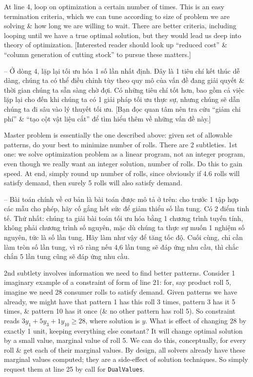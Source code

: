 \documentclass{article}
\begin{document}
\begin{itemize}
\begin{itemize}
\begin{itemize}
            At line 4, loop on optimization a certain number of times. This is an easy termination criteria, which we can tune according to size of problem we are solving \& how long we are willing to wait. There are better criteria, including looping until we have a true optimal solution, but they would lead us deep into theory of optimization. [Interested reader should look up ``reduced cost'' \& ``column generation of cutting stock'' to pursue these matters.]

            -- Ở dòng 4, lặp lại tối ưu hóa 1 số lần nhất định. Đây là 1 tiêu chí kết thúc dễ dàng, chúng ta có thể điều chỉnh tùy theo quy mô của vấn đề đang giải quyết \& thời gian chúng ta sẵn sàng chờ đợi. Có những tiêu chí tốt hơn, bao gồm cả việc lặp lại cho đến khi chúng ta có 1 giải pháp tối ưu thực sự, nhưng chúng sẽ dẫn chúng ta đi sâu vào lý thuyết tối ưu. [Bạn đọc quan tâm nên tra cứu ``giảm chi phí'' \& ``tạo cột vật liệu cắt'' để tìm hiểu thêm về những vấn đề này.]

            Master problem is essentially the one described above: given set of allowable patterns, do your best to minimize number of rolls. There are 2 subtleties. 1st one: we solve optimization problem as a linear program, not an integer program, even though we really want an integer solution, number of rolls. Do this to gain speed. At end, simply round up number of rolls, since obviously if 4.6 rolls will satisfy demand, then surely 5 rolls will also satisfy demand.

            -- Bài toán chính về cơ bản là bài toán được mô tả ở trên: cho trước 1 tập hợp các mẫu cho phép, hãy cố gắng hết sức để giảm thiểu số lần tung. Có 2 điểm tinh tế. Thứ nhất: chúng ta giải bài toán tối ưu hóa bằng 1 chương trình tuyến tính, không phải chương trình số nguyên, mặc dù chúng ta thực sự muốn 1 nghiệm số nguyên, tức là số lần tung. Hãy làm như vậy để tăng tốc độ. Cuối cùng, chỉ cần làm tròn số lần tung, vì rõ ràng nếu 4,6 lần tung sẽ đáp ứng nhu cầu, thì chắc chắn 5 lần tung cũng sẽ đáp ứng nhu cầu.

            2nd subtlety involves information we need to find better patterns. Consider 1 imaginary example of a constraint of form of line 21: for, say product roll 5, imagine we need 28 consumer rolls to satisfy demand. Given patterns we have already, we might have that pattern 1 has this roll 3 times, pattern 3 has it 5 times, \& pattern 10 has it once (\& no other pattern has roll 5). So constraint reads $3y_1 + 5y_3 + 1y_{10}\ge28$, where solution is $y$. What is effect of changing 28 by exactly 1 unit, keeping everything else constant? It will change optimal solution by a small value, marginal value of roll 5. We can do this, conceptually, for every roll \& get each of their marginal values. By design, all solvers already have these marginal values computed; they are a side-effect of solution techniques. So simply request them at line 25 by call for {\tt DualValues}.


\end{itemize}
\end{itemize}
\end{itemize}
\end{document}
